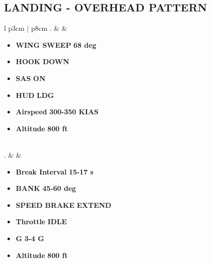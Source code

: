\documentclass[8pt,usenames,dvipsnames,twoside]{article}
\begin{document}
		\subsection{LANDING - OVERHEAD PATTERN}
		\begin{center}
		\end{center}
		
		\begin{center}
			\begin{longtable}{l p{3cm} | p{8cm}}
				. &  \thumbnar & 
				\begin{minipage}[t]{\linewidth}
					\vspace{-7pt}
					\begin{itemize}
						\item \textbf{WING SWEEP} \dotfill \textbf{68 deg}
						\item \textbf{HOOK} \dotfill \textbf{DOWN}
						\item \textbf{SAS} \dotfill \textbf{ON}
						\item \textbf{HUD} \dotfill \textbf{LDG}
						\item \textbf{Airspeed} \dotfill \textbf{300-350 KIAS}
						\item \textbf{Altitude} \dotfill \textbf{800 ft}
					\end{itemize} 
				\end{minipage} \\
				. &  & 
				\begin{minipage}[t]{\linewidth}
					\vspace{-7pt}
					\begin{itemize}
						\item \textbf{Break Interval} \dotfill \textbf{15-17 s}
						\item \textbf{BANK} \dotfill \textbf{45-60 deg}
						\item \textbf{SPEED BRAKE} \dotfill \textbf{EXTEND}
						\item \textbf{Throttle} \dotfill \textbf{IDLE}
						\item \textbf{G} \dotfill \textbf{3-4 G}
						\item \textbf{Altitude} \dotfill \textbf{800 ft}
					\end{itemize} 
				\end{minipage} \\
				\midrule

\end{longtable}
\end{center}
\end{document}
